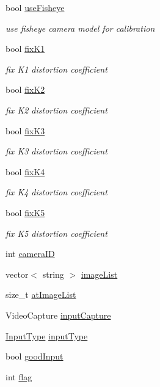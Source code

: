 \begin{DoxyCompactItemize}
bool \mbox{\hyperlink{class_settings_ac8f271630d54f9d0c718ea0130972d44}{use\+Fisheye}}
\begin{DoxyCompactList}\small\item\em use fisheye camera model for calibration \end{DoxyCompactList}\item 
bool \mbox{\hyperlink{class_settings_a25242813ee2c5e111ce48fe1f7f85e7b}{fix\+K1}}
\begin{DoxyCompactList}\small\item\em fix K1 distortion coefficient \end{DoxyCompactList}\item 
bool \mbox{\hyperlink{class_settings_abad0b643dc5a39d493a6343d38f41578}{fix\+K2}}
\begin{DoxyCompactList}\small\item\em fix K2 distortion coefficient \end{DoxyCompactList}\item 
bool \mbox{\hyperlink{class_settings_a433fca3c377d42f1c7d43e35a286913f}{fix\+K3}}
\begin{DoxyCompactList}\small\item\em fix K3 distortion coefficient \end{DoxyCompactList}\item 
bool \mbox{\hyperlink{class_settings_ac993998a56cebe0593cb74fe39858d31}{fix\+K4}}
\begin{DoxyCompactList}\small\item\em fix K4 distortion coefficient \end{DoxyCompactList}\item 
bool \mbox{\hyperlink{class_settings_a4d0d37eef5f3033a8aabc3f09ee29a03}{fix\+K5}}
\begin{DoxyCompactList}\small\item\em fix K5 distortion coefficient \end{DoxyCompactList}\item 
int \mbox{\hyperlink{class_settings_af32a5ff06192bde106c934e0361bcd7e}{camera\+ID}}
\item 
vector$<$ string $>$ \mbox{\hyperlink{class_settings_ae261128a69d1d3d2b0f5315aff8066c8}{image\+List}}
\item 
size\+\_\+t \mbox{\hyperlink{class_settings_a1b89e85a2638e19f2d53269245d19b66}{at\+Image\+List}}
\item 
Video\+Capture \mbox{\hyperlink{class_settings_abd5706146b34d3c32aef4025dcd2ec1b}{input\+Capture}}
\item 
\mbox{\hyperlink{class_settings_a5afe85d24b071973a7f248c05386f7f4}{Input\+Type}} \mbox{\hyperlink{class_settings_a89fb14ce9856fb642f18bb0f7c5b8868}{input\+Type}}
\item 
bool \mbox{\hyperlink{class_settings_a3b9fc27b555f982bd5b9ea5198e1f7e3}{good\+Input}}
\item 
int \mbox{\hyperlink{class_settings_aba5691e3e76525f93ea254e654ec3717}{flag}}
\end{DoxyCompactItemize}


